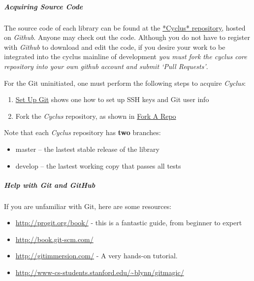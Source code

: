 \documentclass[letterpaper,10pt,english]{sphinxmanual}
\begin{document}
\subparagraph{Acquiring Source Code}
\label{devdoc/get_and_build:acquiring-source-code}
The source code of each library can be found at the \href{https://github.com/cyclus}{*Cyclus*
repository}, hosted on \emph{Github}. Anyone may
check out the code. Although you do not have to register with \emph{Github} to
download and edit the code, if you desire your work to be integrated into the
cyclus mainline of development \emph{you must fork the cyclus core repository into
your own github account and submit `Pull Requests'}.

For the Git uninitiated, one must perform the following steps to acquire \emph{Cyclus}:
\begin{enumerate}
\item {} 
\href{http://help.github.com/linux-set-up-git/}{Set Up Git} shows one how to set up SSH keys and Git user info

\item {} 
Fork the \emph{Cyclus} repository, as shown in \href{http://help.github.com/fork-a-repo/}{Fork A Repo}

\end{enumerate}

Note that each \emph{Cyclus} repository has \textbf{two} branches:
\begin{itemize}
\item {} 
master -- the lastest stable release of the library

\item {} 
develop -- the lastest working copy that passes all tests

\end{itemize}


\subparagraph{Help with Git and GitHub}
\label{devdoc/get_and_build:fork-a-repo}\label{devdoc/get_and_build:help-with-git-and-github}
If you are unfamiliar with Git, here are some resources:
\begin{itemize}
\item {} 
\href{http://progit.org/book/}{http://progit.org/book/} - this is a fantastic guide, from beginner to expert

\item {} 
\href{http://book.git-scm.com/}{http://book.git-scm.com/}

\item {} 
\href{http://gitimmersion.com/}{http://gitimmersion.com/} - A very hands-on tutorial.

\item {} 
\href{http://www-cs-students.stanford.edu/~blynn/gitmagic/}{http://www-cs-students.stanford.edu/\textasciitilde{}blynn/gitmagic/}

\end{itemize}
\end{document}

